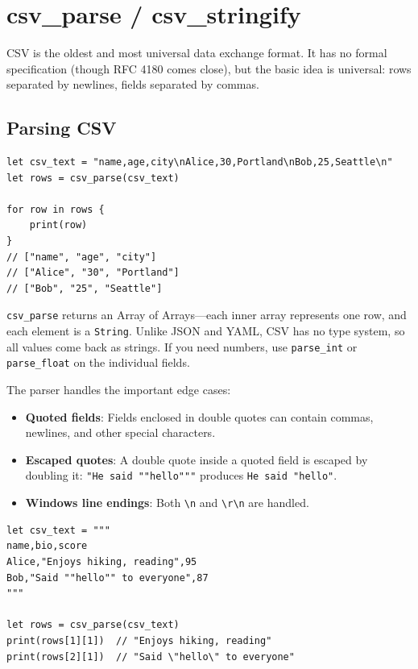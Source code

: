 \section{csv\_parse / csv\_stringify}\label{sec:csv}


CSV is the oldest and most universal data exchange format. It has no
formal specification (though RFC 4180 comes close), but the basic idea is
universal: rows separated by newlines, fields separated by commas.

\subsection{Parsing CSV}

\begin{lstlisting}[language=Lattice, caption={Parsing CSV data}]
let csv_text = "name,age,city\nAlice,30,Portland\nBob,25,Seattle\n"
let rows = csv_parse(csv_text)

for row in rows {
    print(row)
}
// ["name", "age", "city"]
// ["Alice", "30", "Portland"]
// ["Bob", "25", "Seattle"]
\end{lstlisting}

\lstinline|csv_parse| returns an Array of Arrays---each inner array
represents one row, and each element is a \lstinline|String|. Unlike JSON and
YAML, CSV has no type system, so all values come back as strings. If you
need numbers, use \lstinline|parse_int| or \lstinline|parse_float| on the
individual fields.

The parser handles the important edge cases:

\begin{itemize}
    \item \textbf{Quoted fields}: Fields enclosed in double quotes can contain
          commas, newlines, and other special characters.
    \item \textbf{Escaped quotes}: A double quote inside a quoted field is
          escaped by doubling it: \texttt{"He said ""hello"""} produces
          \texttt{He said "hello"}.
    \item \textbf{Windows line endings}: Both \texttt{\textbackslash n} and
          \texttt{\textbackslash r\textbackslash n} are handled.
\end{itemize}

\begin{lstlisting}[language=Lattice, caption={Parsing CSV with quoted fields}]
let csv_text = """
name,bio,score
Alice,"Enjoys hiking, reading",95
Bob,"Said ""hello"" to everyone",87
"""

let rows = csv_parse(csv_text)
print(rows[1][1])  // "Enjoys hiking, reading"
print(rows[2][1])  // "Said \"hello\" to everyone"
\end{lstlisting}

